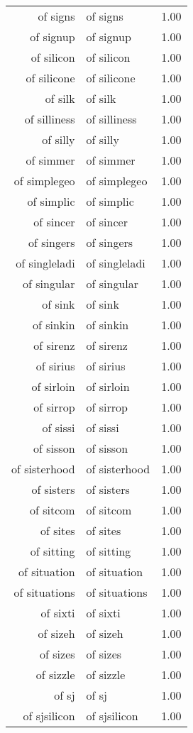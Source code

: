 \begin{table}[ht]
\begin{tabular}{rlr}
  of signs & of signs & 1.00 \\ 
  of signup & of signup & 1.00 \\ 
  of silicon & of silicon & 1.00 \\ 
  of silicone & of silicone & 1.00 \\ 
  of silk & of silk & 1.00 \\ 
  of silliness & of silliness & 1.00 \\ 
  of silly & of silly & 1.00 \\ 
  of simmer & of simmer & 1.00 \\ 
  of simplegeo & of simplegeo & 1.00 \\ 
  of simplic & of simplic & 1.00 \\ 
  of sincer & of sincer & 1.00 \\ 
  of singers & of singers & 1.00 \\ 
  of singleladi & of singleladi & 1.00 \\ 
  of singular & of singular & 1.00 \\ 
  of sink & of sink & 1.00 \\ 
  of sinkin & of sinkin & 1.00 \\ 
  of sirenz & of sirenz & 1.00 \\ 
  of sirius & of sirius & 1.00 \\ 
  of sirloin & of sirloin & 1.00 \\ 
  of sirrop & of sirrop & 1.00 \\ 
  of sissi & of sissi & 1.00 \\ 
  of sisson & of sisson & 1.00 \\ 
  of sisterhood & of sisterhood & 1.00 \\ 
  of sisters & of sisters & 1.00 \\ 
  of sitcom & of sitcom & 1.00 \\ 
  of sites & of sites & 1.00 \\ 
  of sitting & of sitting & 1.00 \\ 
  of situation & of situation & 1.00 \\ 
  of situations & of situations & 1.00 \\ 
  of sixti & of sixti & 1.00 \\ 
  of sizeh & of sizeh & 1.00 \\ 
  of sizes & of sizes & 1.00 \\ 
  of sizzle & of sizzle & 1.00 \\ 
  of sj & of sj & 1.00 \\ 
  of sjsilicon & of sjsilicon & 1.00 \\ 

\end{tabular}
\end{table}

